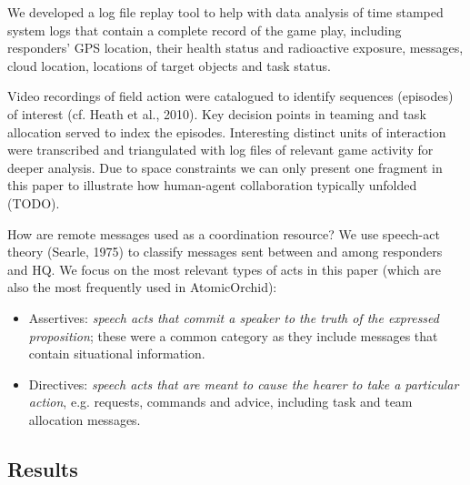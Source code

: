 We developed a log file replay tool to help with data analysis of time stamped system logs that contain a complete record of the game play, including responders' GPS location, their health status and radioactive exposure, messages, cloud location, locations of target objects and task status.

Video recordings of field action were catalogued to identify sequences (episodes) of interest (cf. Heath et al., 2010). Key decision points in teaming and task allocation served to index the episodes. Interesting distinct units of interaction were transcribed and triangulated with log files of relevant game activity for deeper analysis. Due to space constraints we can only  present one fragment in this paper to illustrate how human-agent collaboration typically unfolded (TODO).

How are remote messages used as a coordination resource? We use speech-act theory (Searle, 1975) to classify messages sent between and among responders and HQ. We focus on the most relevant types of acts in this paper (which are also the most frequently used in AtomicOrchid):

\begin{itemize}
\item Assertives: \textit{speech acts that commit a speaker to the truth of the expressed proposition}; these were a common category as they include messages that contain situational information.
\item Directives: \textit{speech acts that are meant to cause the hearer to take a particular action}, e.g. requests, commands and advice, including task and team allocation messages. 
\end{itemize}

\subsection{Results}

